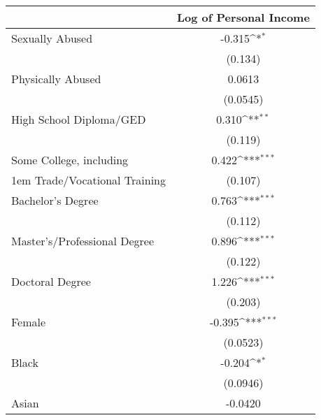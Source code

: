 \documentclass[9pt]{extarticle}
\begin{document}
\pagebreak
{
\def\sym#1{\ifmmode^{#1}\else\(^{#1}\)\fi}
\begin{longtable}[l]{l*{1}{c}}
\hline\hline
                                                  &\multicolumn{1}{c}{Log of Personal Income}\\
\hline
Sexually Abused 								  &                   -0.315\sym{*}  \\
                                                  &                  (0.134)         \\
[0.3em]
Physically Abused 								  &                   0.0613         \\
                                                  &                 (0.0545)         \\
[0.3em]
High School Diploma/GED                 		  &                    0.310\sym{**} \\
                                                  &                  (0.119)         \\
[0.3em]
Some College, including		          			  &                    0.422\sym{***}\\
\kern 1em Trade/Vocational Training               &                  (0.107)         \\
[0.3em]
Bachelor's Degree                       		  &                    0.763\sym{***}\\
                                                  &                  (0.112)         \\
[0.3em]
Master's/Professional Degree            		  &                    0.896\sym{***}\\
                                                  &                  (0.122)         \\
[0.3em]
Doctoral Degree                         		  &                    1.226\sym{***}\\
                                                  &                  (0.203)         \\
[0.3em]
Female                                  		  &                   -0.395\sym{***}\\
                                                  &                 (0.0523)         \\
[0.3em]
Black                                		      &                   -0.204\sym{*}  \\
                                                  &                 (0.0946)         \\
[0.3em]
Asian                                  			  &                  -0.0420         \\

\end{longtable}}
\end{document}
